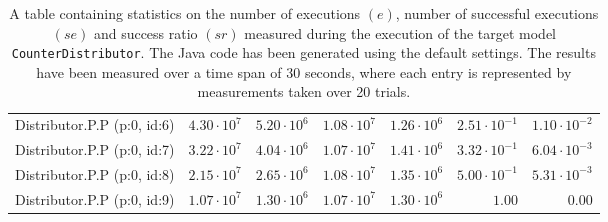 \begin{table}[htbp]
{\begin{tabular}{lrrrrrr}
\hspace{3mm}Distributor.P.P (p:0, id:6) & $4.30 \cdot 10^{7}$ & $5.20 \cdot 10^{6}$ & $1.08 \cdot 10^{7}$ & $1.26 \cdot 10^{6}$ & $2.51 \cdot 10^{-1}$ & $1.10 \cdot 10^{-2}$ \\
\hspace{3mm}Distributor.P.P (p:0, id:7) & $3.22 \cdot 10^{7}$ & $4.04 \cdot 10^{6}$ & $1.07 \cdot 10^{7}$ & $1.41 \cdot 10^{6}$ & $3.32 \cdot 10^{-1}$ & $6.04 \cdot 10^{-3}$ \\
\hspace{3mm}Distributor.P.P (p:0, id:8) & $2.15 \cdot 10^{7}$ & $2.65 \cdot 10^{6}$ & $1.08 \cdot 10^{7}$ & $1.35 \cdot 10^{6}$ & $5.00 \cdot 10^{-1}$ & $5.31 \cdot 10^{-3}$ \\
\hspace{3mm}Distributor.P.P (p:0, id:9) & $1.07 \cdot 10^{7}$ & $1.30 \cdot 10^{6}$ & $1.07 \cdot 10^{7}$ & $1.30 \cdot 10^{6}$ &               $1.00$ &               $0.00$ \\
\bottomrule
\end{tabular}
}
\caption{A table containing statistics on the number of executions $(e)$, number of successful executions $(se)$ and success ratio $(sr)$ measured during the execution of the target model \texttt{CounterDistributor}. The Java code has been generated using the default settings. The results have been measured over a time span of 30 seconds, where each entry is represented by measurements taken over 20 trials.}
\label{table:frequency_results_counterdistributor_default}
\end{table}